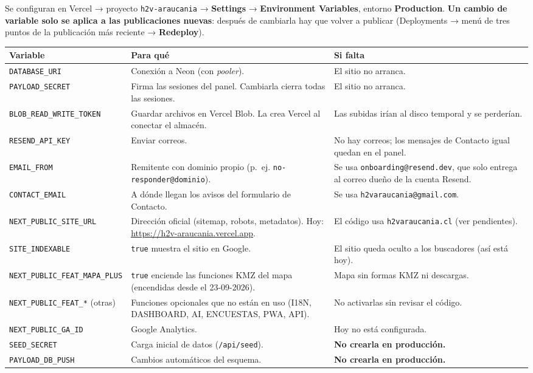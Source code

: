 \documentclass[11pt,letterpaper]{article}
\newcommand{\var}[1]{\nolinkurl{#1}}
\newcommand{\ruta}[1]{\nolinkurl{#1}}
\newcommand{\cab}[1]{\textbf{\color{h2vgris}#1}}
\begin{document}
Se configuran en Vercel → proyecto \var{h2v-araucania} → \textbf{Settings} → \textbf{Environment Variables}, entorno \textbf{Production}. \textbf{Un cambio de variable solo se aplica a las publicaciones nuevas}: después de cambiarla hay que volver a publicar (Deployments → menú de tres puntos de la publicación más reciente → \textbf{Redeploy}).

\begin{tabularx}{\textwidth}{@{}P{4.9cm}YP{3.7cm}@{}}
\toprule
\cab{Variable} & \cab{Para qué} & \cab{Si falta}\\
\midrule
\var{DATABASE_URI} & Conexión a Neon (con \emph{pooler}). & El sitio no arranca.\\
\var{PAYLOAD_SECRET} & Firma las sesiones del panel. Cambiarla cierra todas las sesiones. & El sitio no arranca.\\
\var{BLOB_READ_WRITE_TOKEN} & Guardar archivos en Vercel Blob. La crea Vercel al conectar el almacén. & Las subidas irían al disco temporal y se perderían.\\
\var{RESEND_API_KEY} & Enviar correos. & No hay correos; los mensajes de Contacto igual quedan en el panel.\\
\var{EMAIL_FROM} & Remitente con dominio propio (p.~ej. \var{no-responder@dominio}). & Se usa \var{onboarding@resend.dev}, que solo entrega al correo dueño de la cuenta Resend.\\
\var{CONTACT_EMAIL} & A dónde llegan los avisos del formulario de Contacto. & Se usa \var{h2varaucania@gmail.com}.\\
\var{NEXT_PUBLIC_SITE_URL} & Dirección oficial (sitemap, robots, metadatos). Hoy: \url{https://h2v-araucania.vercel.app}. & El código usa \var{h2varaucania.cl} (ver pendientes).\\
\var{SITE_INDEXABLE} & \var{true} muestra el sitio en Google. & El sitio queda oculto a los buscadores (así está hoy).\\
\var{NEXT_PUBLIC_FEAT_MAPA_PLUS} & \var{true} enciende las funciones KMZ del mapa (encendidas desde el 23-09-2026). & Mapa sin formas KMZ ni descargas.\\
\var{NEXT_PUBLIC_FEAT_*} (otras) & Funciones opcionales que no están en uso (I18N, DASHBOARD, AI, ENCUESTAS, PWA, API). & No activarlas sin revisar el código.\\
\var{NEXT_PUBLIC_GA_ID} & Google Analytics. & Hoy no está configurada.\\
\var{SEED_SECRET} & Carga inicial de datos (\ruta{/api/seed}). & \textbf{No crearla en producción.}\\
\var{PAYLOAD_DB_PUSH} & Cambios automáticos del esquema. & \textbf{No crearla en producción.}\\
\bottomrule
\end{tabularx}
\end{document}
